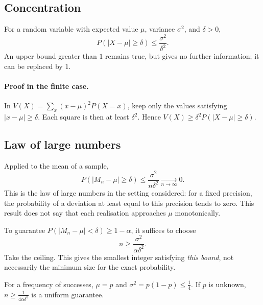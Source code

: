 \subsection{Concentration}
\begin{keypoint}
For a random variable with expected value $\mu$, variance $\sigma^2$, and $\delta>0$,
\[P(|X-\mu|\ge\delta)\le\frac{\sigma^2}{\delta^2}.\]
An upper bound greater than $1$ remains true, but gives no further information; it can be replaced by $1$.
\end{keypoint}
\paragraph{Proof in the finite case.} In $V(X)=\sum_x(x-\mu)^2P(X=x)$, keep only the values satisfying $|x-\mu|\ge\delta$. Each square is then at least $\delta^2$. Hence $V(X)\ge\delta^2P(|X-\mu|\ge\delta)$.
\subsection{Law of large numbers}
Applied to the mean of a sample,
\[P(|M_n-\mu|\ge\delta)\le\frac{\sigma^2}{n\delta^2}\xrightarrow[n\to\infty]{}0.\]
This is the law of large numbers in the setting considered: for a fixed precision, the probability of a deviation at least equal to this precision tends to zero. This result does not say that each realisation approaches $\mu$ monotonically.
\begin{method}
To guarantee $P(|M_n-\mu|<\delta)\ge1-\alpha$, it suffices to choose
\[n\ge\frac{\sigma^2}{\alpha\delta^2}.\]
Take the ceiling. This gives the smallest integer satisfying \emph{this bound}, not necessarily the minimum size for the exact probability.
\end{method}
For a frequency of successes, $\mu=p$ and $\sigma^2=p(1-p)\le\frac{1}{4}$. If $p$ is unknown, $n\ge\frac{1}{4\alpha\delta^2}$ is a uniform guarantee.


\mxnewpage
